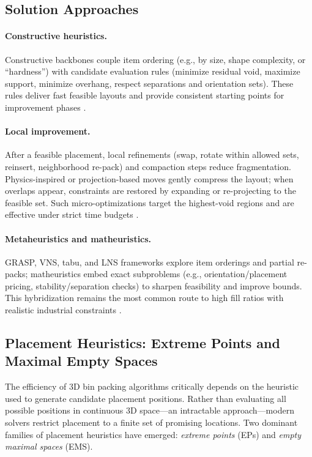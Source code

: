 \subsection{Solution Approaches}

\paragraph{Constructive heuristics.}
Constructive backbones couple item ordering (e.g., by size, shape complexity, or ``hardness'') with candidate evaluation rules (minimize residual void, maximize support, minimize overhang, respect separations and orientation sets). These rules deliver fast feasible layouts and provide consistent starting points for improvement phases \cite{ARCO22}.

\paragraph{Local improvement.}
After a feasible placement, local refinements (swap, rotate within allowed sets, reinsert, neighborhood re-pack) and compaction steps reduce fragmentation. Physics-inspired or projection-based moves gently compress the layout; when overlaps appear, constraints are restored by expanding or re-projecting to the feasible set. Such micro-optimizations target the highest-void regions and are effective under strict time budgets \cite{ARCO22}.

\paragraph{Metaheuristics and matheuristics.}
GRASP, VNS, tabu, and LNS frameworks explore item orderings and partial re-packs; matheuristics embed exact subproblems (e.g., orientation/placement pricing, stability/separation checks) to sharpen feasibility and improve bounds. This hybridization remains the most common route to high fill ratios with realistic industrial constraints \cite{ARCO22}.

\subsection{Placement Heuristics: Extreme Points and Maximal Empty Spaces}
\label{sec:placement-heuristics}

The efficiency of 3D bin packing algorithms critically depends on the heuristic used to generate candidate placement positions. Rather than evaluating all possible positions in continuous 3D space---an intractable approach---modern solvers restrict placement to a finite set of promising locations. Two dominant families of placement heuristics have emerged: \textit{extreme points} (EPs) and \textit{empty maximal spaces} (EMS).

